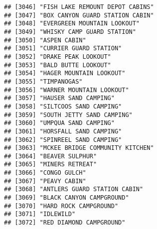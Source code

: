 \documentclass[
]{article}
\begin{document}
\begin{verbatim}
## [3046] "FISH LAKE REMOUNT DEPOT CABINS"                                                      
## [3047] "BOX CANYON GUARD STATION CABIN"                                                      
## [3048] "EVERGREEN MOUNTAIN LOOKOUT"                                                          
## [3049] "WHISKY CAMP GUARD STATION"                                                           
## [3050] "ASPEN CABIN"                                                                         
## [3051] "CURRIER GUARD STATION"                                                               
## [3052] "DRAKE PEAK LOOKOUT"                                                                  
## [3053] "BALD BUTTE LOOKOUT"                                                                  
## [3054] "HAGER MOUNTAIN LOOKOUT"                                                              
## [3055] "TIMPANOGAS"                                                                          
## [3056] "WARNER MOUNTAIN LOOKOUT"                                                             
## [3057] "HAUSER SAND CAMPING"                                                                 
## [3058] "SILTCOOS SAND CAMPING"                                                               
## [3059] "SOUTH JETTY SAND CAMPING"                                                            
## [3060] "UMPQUA SAND CAMPING"                                                                 
## [3061] "HORSFALL SAND CAMPING"                                                               
## [3062] "SPINREEL SAND CAMPING"                                                               
## [3063] "MCKEE BRIDGE COMMUNITY KITCHEN"                                                      
## [3064] "BEAVER SULPHUR"                                                                      
## [3065] "MINERS RETREAT"                                                                      
## [3066] "CONGO GULCH"                                                                         
## [3067] "PEAVY CABIN"                                                                         
## [3068] "ANTLERS GUARD STATION CABIN"                                                         
## [3069] "BLACK CANYON CAMPGROUND"                                                             
## [3070] "HARD ROCK CAMPGROUND"                                                                
## [3071] "IDLEWILD"                                                                            
## [3072] "RED DIAMOND CAMPGROUND"                                                              

\end{verbatim}
\end{document}
